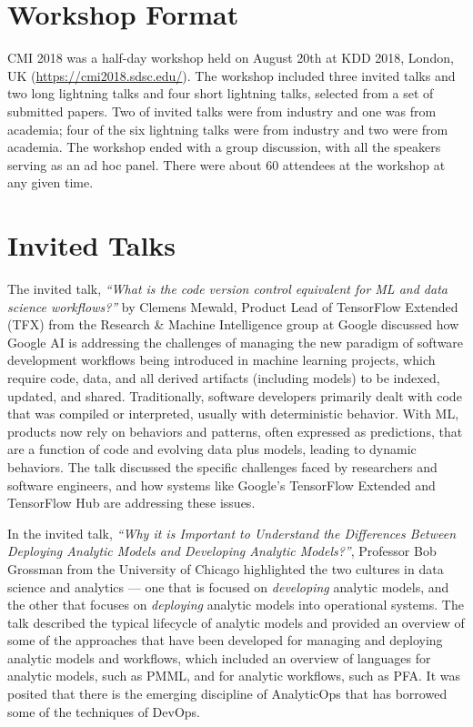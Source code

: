 \documentclass[11pt]{article}
\begin{document}
\section{Workshop Format}

CMI 2018 was a half-day workshop held on August 20th at KDD 2018, London, UK (\url{https://cmi2018.sdsc.edu/}).  The workshop included three invited talks and two long lightning talks and four short lightning talks, selected from a set of submitted papers. Two of invited talks were from industry and one was from academia; four of the six lightning talks were from industry and two were from academia. The workshop ended with a group discussion, with all the speakers serving as an ad hoc panel. There were about 60 attendees at the workshop at any given time.

\section{Invited Talks}

The invited talk, \emph{``What is the code version control equivalent for ML and data science workflows?''} by Clemens Mewald, Product Lead of TensorFlow Extended (TFX) from the Research \& Machine Intelligence group at Google discussed how Google AI is addressing the challenges of managing the new paradigm of software development workflows being introduced in machine learning projects, which require code, data, and all derived artifacts (including models) to be indexed, updated, and shared. Traditionally, software developers primarily dealt with code that was compiled or interpreted, usually with deterministic behavior. With ML, products now rely on behaviors and patterns, often expressed as predictions, that are a function of code and evolving data plus models, leading to dynamic behaviors. The talk discussed the specific challenges faced by researchers and software engineers, and how systems like Google’s TensorFlow Extended and TensorFlow Hub are addressing these issues.

In the invited talk, \emph{``Why it is Important to Understand the Differences Between Deploying Analytic Models and Developing Analytic Models?''}, Professor Bob Grossman from the University of Chicago highlighted the two cultures in data science and analytics --- one that is focused on \emph{developing} analytic models, and the other that focuses on \emph{deploying} analytic models into operational systems. The talk described the typical lifecycle of analytic models and provided an overview of some of the approaches that have been developed for managing and deploying analytic models and workflows, which included an overview of languages for analytic models, such as PMML, and for analytic workflows, such as PFA.  It was posited that there is the emerging discipline of AnalyticOps that has borrowed some of the techniques of DevOps.
\end{document}
